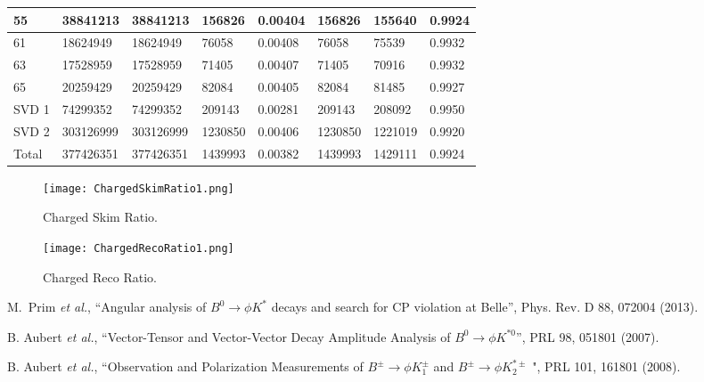 \documentclass[11pt]{article}
\def\etal{{\it et al.}}
\begin{document}
\begin{tabular}{ | l || l | l | l | l || l | l | l |}
  55&38841213&38841213&156826&0.00404&156826&155640&0.9924\\\hline
  61&18624949&18624949&76058&0.00408&76058&75539&0.9932\\\hline
  63&17528959&17528959&71405&0.00407&71405&70916&0.9932\\\hline
  65&20259429&20259429&82084&0.00405&82084&81485&0.9927\\\hline
  \hline
  SVD 1&74299352&74299352&209143&0.00281&209143&208092&0.9950\\\hline
  SVD 2&303126999&303126999&1230850&0.00406&1230850&1221019&0.9920\\\hline
  Total&377426351&377426351&1439993&0.00382&1439993&1429111&0.9924\\\hline
\end{tabular}


\begin{figure}[!tbh]
  \centering
  \begin{minipage}[b]{0.4\textwidth}
    \texttt{[image: ChargedSkimRatio1.png]}
      \caption{Charged Skim Ratio.}
  \end{minipage}
  \hfill
  \begin{minipage}[b]{0.4\textwidth}
    \texttt{[image: ChargedRecoRatio1.png]}
    \caption{Charged Reco Ratio.}
  \end{minipage}
\end{figure}

\begin{thebibliography}{99}
 M.~Prim \etal, ``Angular analysis of $B^0 \to \phi
  K^*$ decays and search for CP violation at Belle'', Phys. Rev. D 88, 072004 (2013).
  
 B. Aubert \etal, ``Vector-Tensor and Vector-Vector
  Decay Amplitude Analysis of $B^0\to\phi K^{*0}$'', PRL 98, 051801 (2007).
  
 B. Aubert \etal, ``Observation and Polarization
  Measurements of $B^\pm\to\phi K_1^\pm$ and $B^\pm\to\phi K_2^{*\pm}$ ", PRL 101, 161801 (2008).
\end{thebibliography} 
\end{document}
